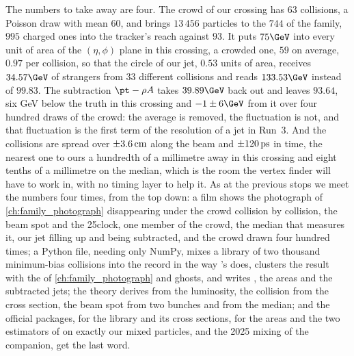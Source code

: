 The numbers to take away are four. The crowd of our crossing has $63$
collisions, a Poisson draw with mean $60$, and brings $13\,456$ particles
to the $744$ of the family, $995$ charged ones into the tracker's reach
against $93$. It puts $75\GeV$ into every unit of area of the
$(\eta,\phi)$ plane in this crossing, a crowded one, $59$ on average,
$0.97$ per collision, so that the circle of our jet, $0.53$ units of
area, receives $34.57\GeV$ of strangers from $33$ different collisions and
reads $133.53\GeV$ instead of $99.83$. The subtraction $\pt-\rhoPU A$ takes
$39.89\GeV$ back out and leaves $93.64$, six GeV below the truth in this
crossing and $-1\pm6\GeV$ from it over four hundred draws of the crowd:
the average is removed, the fluctuation is not, and that fluctuation is
the first term of the resolution of a jet in Run~3. And the collisions are
spread over $\pm3.6\,\mathrm{cm}$ along the beam and $\pm120\,\mathrm{ps}$ in time, the
nearest one to ours a hundredth of a millimetre away in this crossing and
eight tenths of a millimetre on the median, which is the room the vertex
finder will have to work in, with no timing layer to help it. As at the previous stops we
meet the numbers four times, from the top down: a film shows the
photograph of \cref{ch:family_photograph} disappearing under the crowd
collision by collision, the beam spot and the 25\ns clock, one member of
the crowd, the median that measures it, our jet filling up and being
subtracted, and the crowd drawn four hundred times; a Python file, needing
only NumPy, mixes a library of two thousand minimum-bias collisions into
the record in the way \CMSSW's \Mix does, clusters the result with the
\antikt of \cref{ch:family_photograph} and ghosts, and writes \rhoPU, the
areas and the subtracted jets; the theory derives \mup from the
luminosity, the collision from the cross section, the beam spot from two
bunches and \rhoPU from the median; and the official packages, \PYTHIA for
the library and its cross sections, \FASTJET for the areas and the two
estimators of \rhoPU on exactly our mixed particles, and the 2025 \CMSSW
mixing of the companion, get the last word.

